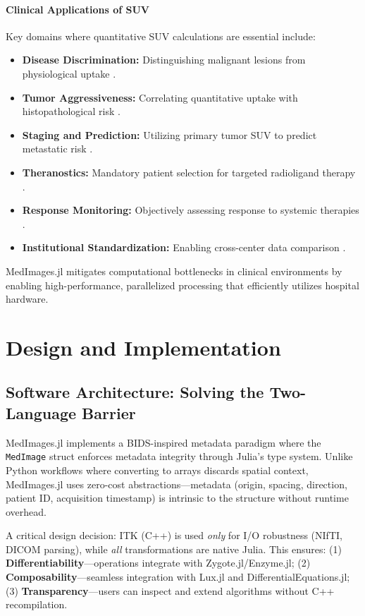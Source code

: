 \documentclass[10pt,letterpaper]{article}
\begin{document}
\paragraph{Clinical Applications of SUV} 
Key domains where quantitative SUV calculations are essential include:
\begin{itemize}
    \item \textbf{Disease Discrimination:} Distinguishing malignant lesions from physiological uptake \cite{CaraccioloCastello2024, PEPEPEPE2023}.
    \item \textbf{Tumor Aggressiveness:} Correlating quantitative uptake with histopathological risk \cite{ZhangLi2020, SharmaKumar2023}.
    \item \textbf{Staging and Prediction:} Utilizing primary tumor SUV to predict metastatic risk \cite{KlingenbergJochumsen2020, elenGltekin2020}.
    \item \textbf{Theranostics:} Mandatory patient selection for targeted radioligand therapy \cite{AmalachandranSivathapandi2024}.
    \item \textbf{Response Monitoring:} Objectively assessing response to systemic therapies \cite{UdovicichJia2025, EsenSeymen2023}.
    \item \textbf{Institutional Standardization:} Enabling cross-center data comparison \cite{GengZhang2024}.
\end{itemize}

MedImages.jl mitigates computational bottlenecks in clinical environments by enabling high-performance, parallelized processing that efficiently utilizes hospital hardware.

\section*{Design and Implementation}

\subsection*{Software Architecture: Solving the Two-Language Barrier}
MedImages.jl implements a BIDS-inspired metadata paradigm where the \texttt{MedImage} struct enforces metadata integrity through Julia's type system. Unlike Python workflows where converting to arrays discards spatial context, MedImages.jl uses zero-cost abstractions—metadata (origin, spacing, direction, patient ID, acquisition timestamp) is intrinsic to the structure without runtime overhead.

A critical design decision: ITK (C++) is used \textit{only} for I/O robustness (NIfTI, DICOM parsing), while \textit{all} transformations are native Julia. This ensures: (1) \textbf{Differentiability}—operations integrate with Zygote.jl/Enzyme.jl; (2) \textbf{Composability}—seamless integration with Lux.jl and DifferentialEquations.jl; (3) \textbf{Transparency}—users can inspect and extend algorithms without C++ recompilation.
\end{document}
